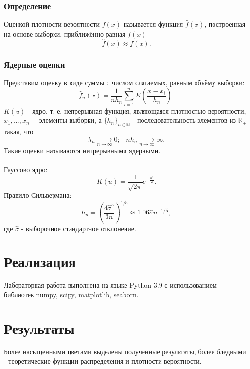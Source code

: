 \documentclass[a4paper,12pt]{article} %
\begin{document}
\subsubsection{Определение}
Оценкой плотности вероятности $f(x)$ называется функция $\widehat{f}(x)$, построенная на основе выборки, приближённо равная $f(x)$
\begin{equation}
    \widehat{f}(x)\approx f(x).
\end{equation}
\subsubsection{Ядерные оценки}
Представим оценку в виде суммы с числом слагаемых, равным объёму выборки:
\begin{equation}
    \widehat{f}_n(x)=\frac{1}{n h_n}\sum_{i=1}^n K\left(\frac{x-x_i}{h_n}\right).
\end{equation}
$K(u)$ - ядро, т. е. непрерывная функция, являющаяся плотностью вероятности, $x_1,...,x_n$ $-$ элементы выборки, а $\{h_n\}_{n\in\mathbb{N}}$ - последовательность элементов из $\mathbb{R}_+$ такая, что
\begin{equation}
    h_n\xrightarrow[n\to\infty]{}0;\;\;\;n h_n\xrightarrow[n\to\infty]{}\infty.
\end{equation}
Такие оценки называются непрерывными ядерными.\\\\
Гауссово ядро:
\begin{equation}
    K(u)=\frac{1}{\sqrt{2\pi}}e^{-\frac{u^2}{2}}.
\end{equation}
Правило Сильвермана:
\begin{equation}
    h_n=\left(\frac{4\hat{\sigma}^5}{3n}\right)^{1/5}\approx1.06\hat{\sigma}n^{-1/5},
\end{equation}
где $\hat{\sigma}$ - выборочное стандартное отклонение.
\section{Реализация}
Лабораторная работа выполнена на языке Python 3.9 с использованием библиотек numpy, scipy, matplotlib, seaborn.
\section{Результаты}
Более насыщенными цветами выделены полученные результаты, более бледными - теоретические функции распределения и плотности вероятности.
\end{document}
